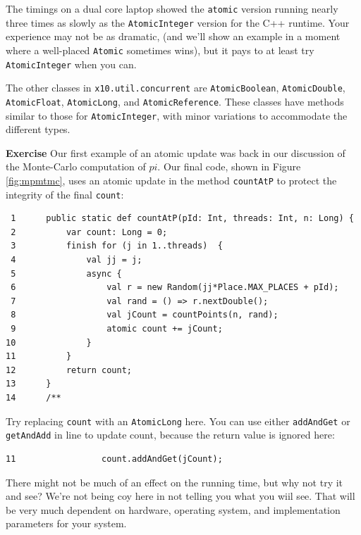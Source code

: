 The timings on a dual core laptop showed the {\tt atomic} version running nearly
three times as slowly as the {\tt AtomicInteger} version 
for the C++ runtime.  Your experience may not be as dramatic,
(and we'll show an example in a moment where a well-placed {\tt Atomic} sometimes wins),
but it pays to at least try {\tt AtomicInteger} when you can.

The other classes in {\tt x10.util.concurrent} are {\tt AtomicBoolean}, 
{\tt AtomicDouble}, {\tt AtomicFloat}, {\tt AtomicLong}, and
{\tt AtomicReference}.  These classes have methods similar to those for
{\tt AtomicInteger}, with minor variations to accommodate the different
types.

{\bf Exercise}  Our first example of an atomic update was back in
our discussion of the Monte-Carlo computation of $pi$.  Our final code,
shown in Figure \ref{fig:mpmtmc}, uses an atomic update in the
method {\tt countAtP} to protect the integrity of the final {\tt count}:
\begin{verbatim}
 1      public static def countAtP(pId: Int, threads: Int, n: Long) {
 2          var count: Long = 0;
 3          finish for (j in 1..threads)  {
 4              val jj = j;
 5              async {
 6                  val r = new Random(jj*Place.MAX_PLACES + pId);
 7                  val rand = () => r.nextDouble();
 8                  val jCount = countPoints(n, rand);
 9                  atomic count += jCount;
10              }
11          }
12          return count;
13      }
14      /**
\end{verbatim}
Try replacing {\tt count} with an {\tt AtomicLong} here.  You can use 
either {\tt addAndGet} or {\tt getAndAdd} in line 
to update count, because the return value is ignored here:
\begin{verbatim}
11                 count.addAndGet(jCount);
\end{verbatim}
There might not be much of an effect on the running time, but why not try it
and see?  We're not being coy here in not telling you what you wiil
see.  That will be very much dependent
on hardware, operating system, and implementation parameters for your system.

